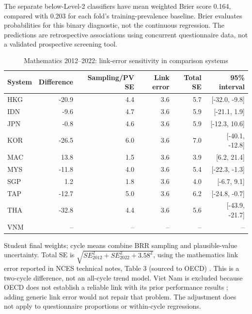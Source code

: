 The separate below-Level-2 classifiers have mean weighted Brier score 0.164, compared with 0.203 for each fold's training-prevalence baseline. Brier evaluates probabilities for this binary diagnostic, not the continuous regression. The predictions are retrospective associations using concurrent questionnaire data, not a validated prospective screening tool.

\begin{table}[H]\centering\scriptsize
\caption{Mathematics 2012--2022: link-error sensitivity in comparison systems}\label{tab:linkerror}
\begin{tabular}{@{}lrrrrr@{}}
\toprule
System & Difference & Sampling/PV SE & Link error & Total SE & 95\% interval\\
\midrule
HKG & -20.9 & 4.4 & 3.6 & 5.7 & [-32.0, -9.8]\\
IDN & -9.6 & 4.7 & 3.6 & 5.9 & [-21.1, 1.9]\\
JPN & -0.8 & 4.6 & 3.6 & 5.9 & [-12.3, 10.6]\\
KOR & -26.5 & 6.0 & 3.6 & 7.0 & [-40.1, -12.8]\\
MAC & 13.8 & 1.5 & 3.6 & 3.9 & [6.2, 21.4]\\
MYS & -11.8 & 4.0 & 3.6 & 5.4 & [-22.3, -1.3]\\
SGP & 1.2 & 1.8 & 3.6 & 4.0 & [-6.7, 9.1]\\
TAP & -12.7 & 5.0 & 3.6 & 6.2 & [-24.8, -0.7]\\
THA & -32.8 & 4.4 & 3.6 & 5.6 & [-43.9, -21.7]\\
VNM & -- & -- & -- & -- & --\\
\bottomrule
\end{tabular}
\par\smallskip\raggedright\footnotesize Student final weights; cycle means combine BRR sampling and plausible-value uncertainty. Total SE is $\sqrt{SE_{2012}^2+SE_{2022}^2+3.58^2}$, using the mathematics link error reported in NCES technical notes, Table 3 (sourced to OECD) \citep{nces2023technical}. This is a two-cycle difference, not an all-cycle trend model. Viet Nam is excluded because OECD does not establish a reliable link with its prior performance results \citep{oecd2023vnm}; adding generic link error would not repair that problem. The adjustment does not apply to questionnaire proportions or within-cycle regressions.
\end{table}
